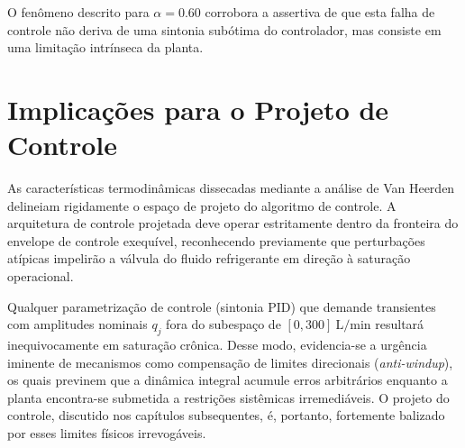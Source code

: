 O fenômeno descrito para $\alpha=0.60$ corrobora a assertiva de que esta falha de controle não deriva de uma sintonia subótima do controlador, mas consiste em uma limitação intrínseca da planta.

\section{Implicações para o Projeto de Controle}
\label{sec:implicacoes_controle}

As características termodinâmicas dissecadas mediante a análise de Van Heerden delineiam rigidamente o espaço de projeto do algoritmo de controle. A arquitetura de controle projetada deve operar estritamente dentro da fronteira do envelope de controle exequível, reconhecendo previamente que perturbações atípicas impelirão a válvula do fluido refrigerante em direção à saturação operacional.

Qualquer parametrização de controle (sintonia PID) que demande transientes com amplitudes nominais $q_j$ fora do subespaço de $[0, 300]\ \si{\liter\per\minute}$ resultará inequivocamente em saturação crônica. Desse modo, evidencia-se a urgência iminente de mecanismos como compensação de limites direcionais (\textit{anti-windup}), os quais previnem que a dinâmica integral acumule erros arbitrários enquanto a planta encontra-se submetida a restrições sistêmicas irremediáveis. O projeto do controle, discutido nos capítulos subsequentes, é, portanto, fortemente balizado por esses limites físicos irrevogáveis.
